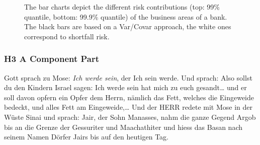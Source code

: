 \begin{figure}
\begin{center}
\end{center}
\caption[The bar charts depict the different risk contributions]{The bar charts depict the different risk contributions (top: 99\% quantile, bottom: 99.9\% quantile) of the business areas of a bank. The black bars
are based on a Var/Covar approach, the white ones correspond to shortfall risk.}
\end{figure}

\subsubsection{H3 A Component Part }
Gott sprach zu Mose:  \emph{Ich werde sein}, der Ich sein werde.
    Und sprach: Also sollst du den Kindern Israel sagen:  Ich werde
    sein \cite{mardia1979ma} hat mich zu euch gesandt\ldots
    und er soll davon opfern ein Opfer dem Herrn, n\"amlich das Fett,
    welches die Eingeweide bedeckt, und alles Fett am Eingeweide,\ldots
    Und der HERR redete mit Mose in der W\"uste Sinai und sprach:
    Jair, der Sohn Manasses, nahm die ganze Gegend Argob bis an die
    Grenze der Gessuriter und Maachathiter und hiess das Basan nach
    seinem Namen D\"orfer Jairs bis auf den heutigen Tag.
    


